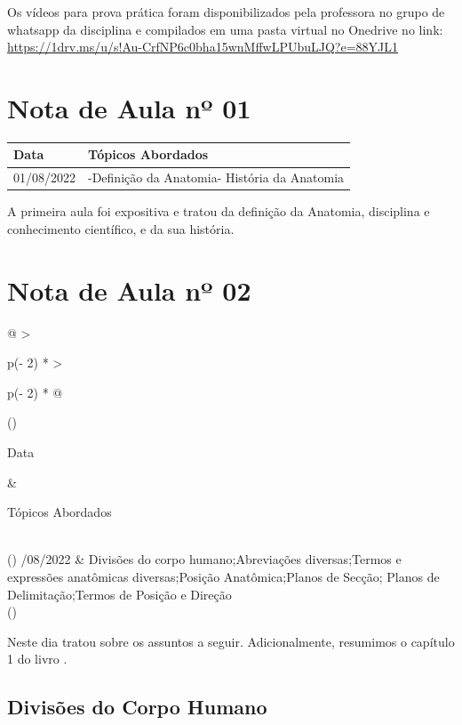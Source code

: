 \documentclass[
]{book}
\begin{document}
Os vídeos para prova prática foram disponibilizados pela professora no grupo de whatsapp da disciplina e compilados em uma pasta virtual no Onedrive no link: \url{https://1drv.ms/u/s!Au-CrfNP6c0bha15wnMffwLPUbuLJQ?e=88YJL1}

\hypertarget{nota-de-aula-nuxba-01}{%
\section{Nota de Aula nº 01}\label{nota-de-aula-nuxba-01}}

\begin{longtable}[]{@{}ll@{}}
\toprule()
Data & Tópicos Abordados \\
\midrule()
\endhead
01/08/2022 & -Definição da Anatomia- História da Anatomia \\
\bottomrule()
\end{longtable}

A primeira aula foi expositiva e tratou da definição da Anatomia, disciplina e conhecimento científico, e da sua história.

\hypertarget{nota-de-aula-nuxba-02}{%
\section{Nota de Aula nº 02}\label{nota-de-aula-nuxba-02}}

\begin{longtable}[]{@{}
  >{\raggedright\arraybackslash}p{(\columnwidth - 2\tabcolsep) * }
  >{\raggedright\arraybackslash}p{(\columnwidth - 2\tabcolsep) * }@{}}
\toprule()
\begin{minipage}[b]{\linewidth}\raggedright
Data
\end{minipage} & \begin{minipage}[b]{\linewidth}\raggedright
Tópicos Abordados
\end{minipage} \\
\midrule()
/08/2022 & Divisões do corpo humano;Abreviações diversas;Termos e expressões anatômicas diversas;Posição Anatômica;Planos de Secção; Planos de Delimitação;Termos de Posição e Direção \\
\bottomrule()
\end{longtable}

Neste dia \citet{PROF-SOUSA-2022} tratou sobre os assuntos a seguir. Adicionalmente, resumimos o capítulo 1 do livro \citet{MARIEB-WILHELM-MALLAT-2014}.

\hypertarget{divisuxf5es-do-corpo-humano}{%
\subsection{Divisões do Corpo Humano}\label{divisuxf5es-do-corpo-humano}}
\end{document}
